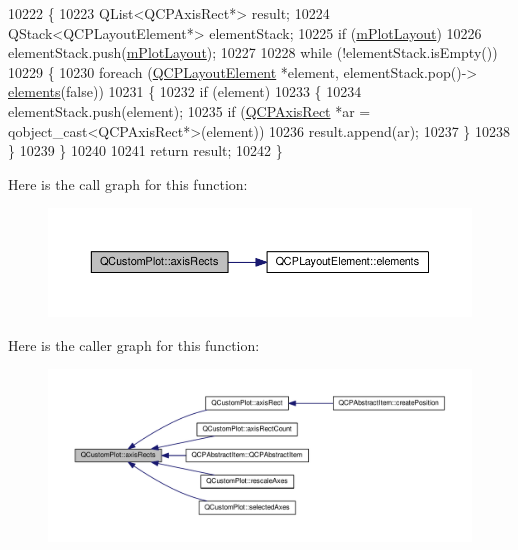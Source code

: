 \begin{DoxyCode}
10222 \{
10223   QList<QCPAxisRect*> result;
10224   QStack<QCPLayoutElement*> elementStack;
10225   \textcolor{keywordflow}{if} (\hyperlink{class_q_custom_plot_ac97298756882a0eecd98151679850ac1}{mPlotLayout})
10226     elementStack.push(\hyperlink{class_q_custom_plot_ac97298756882a0eecd98151679850ac1}{mPlotLayout});
10227   
10228   \textcolor{keywordflow}{while} (!elementStack.isEmpty())
10229   \{
10230     \textcolor{keywordflow}{foreach} (\hyperlink{class_q_c_p_layout_element}{QCPLayoutElement} *element, elementStack.pop()->
      \hyperlink{class_q_c_p_layout_element_a311d60d78e62ef8eaaedb1b6ceb9e788}{elements}(\textcolor{keyword}{false}))
10231     \{
10232       \textcolor{keywordflow}{if} (element)
10233       \{
10234         elementStack.push(element);
10235         \textcolor{keywordflow}{if} (\hyperlink{class_q_c_p_axis_rect}{QCPAxisRect} *ar = qobject\_cast<QCPAxisRect*>(element))
10236           result.append(ar);
10237       \}
10238     \}
10239   \}
10240   
10241   \textcolor{keywordflow}{return} result;
10242 \}
\end{DoxyCode}


Here is the call graph for this function\+:\nopagebreak
\begin{figure}[H]
\begin{center}
\leavevmode
\includegraphics[width=350pt]{class_q_custom_plot_afd67094aaeccbc5719761348b2d8c891_cgraph}
\end{center}
\end{figure}




Here is the caller graph for this function\+:\nopagebreak
\begin{figure}[H]
\begin{center}
\leavevmode
\includegraphics[width=350pt]{class_q_custom_plot_afd67094aaeccbc5719761348b2d8c891_icgraph}
\end{center}
\end{figure}


